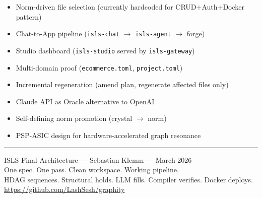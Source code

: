 \documentclass[11pt,a4paper]{article}
\begin{document}
\begin{itemize}[nosep]
\item Norm-driven file selection (currently hardcoded for CRUD+Auth+Docker pattern)
\item Chat-to-App pipeline (\texttt{isls-chat} $\to$ \texttt{isls-agent} $\to$ forge)
\item Studio dashboard (\texttt{isls-studio} served by \texttt{isls-gateway})
\item Multi-domain proof (\texttt{ecommerce.toml}, \texttt{project.toml})
\item Incremental regeneration (amend plan, regenerate affected files only)
\item Claude API as Oracle alternative to OpenAI
\item Self-defining norm promotion (crystal $\to$ norm)
\item PSP-ASIC design for hardware-accelerated graph resonance
\end{itemize}

\vfill
\noindent\rule{\textwidth}{0.4pt}
\begin{center}
\small
ISLS Final Architecture --- Sebastian Klemm --- March 2026\\
One spec. One pass. Clean workspace. Working pipeline.\\
HDAG sequences. Structural holds. LLM fills. Compiler verifies. Docker deploys.\\
\url{https://github.com/LashSesh/graphity}
\end{center}
\end{document}
